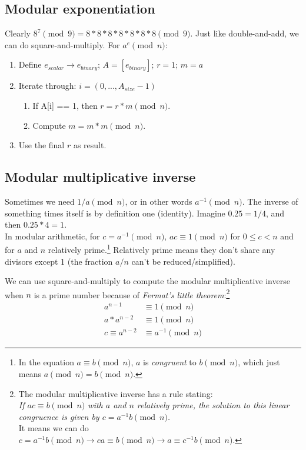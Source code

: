 \subsection{Modular exponentiation}

Clearly $8^7 \pmod 9 = 8*8*8*8*8*8*8 \pmod 9$. Just like double-and-add, we can do square-and-multiply. For $a^e \pmod{n}$:
\begin{enumerate}
	\item Define $e_{scalar} \rightarrow e_{binary}$; $A = [e_{binary}]$; $r = 1$; $m = a$
	\item Iterate through: $i = (0,...,A_{size} - 1)$
	\begin{enumerate}
		\item If A[i] == 1, then $r = r * m \pmod n$.
		\item Compute $m = m * m \pmod n$.
	\end{enumerate}
	\item Use the final $r$ as result.
\end{enumerate}


\subsection{Modular multiplicative inverse}

Sometimes we need $1/a \pmod n$, or in other words $a^{-1} \pmod n$. The inverse of something times itself is by definition one (identity). Imagine $0.25 = 1/4$, and then $0.25*4 = 1$.\\

In modular arithmetic, for $c = a^{-1} \pmod{n}$, $a c \equiv 1 \pmod{n}$ for $0 \leq c < n$ and for $a$ and $n$ relatively prime.\footnote{In the equation $a \equiv b \pmod{n}$, $a$ is {\em congruent} to $b \pmod{n}$, which just means \(a \pmod{n} = b \pmod{n}\).} Relatively prime means they don't share any divisors except 1 (the fraction $a/n$ can't be reduced/simplified).

We can use square-and-multiply to compute the modular multiplicative inverse when $n$ is a prime number because of {\em Fermat's little theorem}:\footnote{\label{inverse_rule_note}The modular multiplicative inverse has a rule stating:\\
{\em If $a c \equiv b \pmod{n}$ with $a$ and $n$ relatively prime, the solution to this linear congruence is given by \(c = a^{-1} b \pmod{n}\).}\cite{wiki-modular-arithmetic}\\
It means we can do $c = a^{-1} b \pmod n \rightarrow ca \equiv b \pmod n \rightarrow a \equiv c^{-1} b \pmod n$.}\vspace{.175cm}
\begin{align*} 
    a^{n-1} &\equiv 1 \pmod{n} \\
    a*a^{n-2} &\equiv 1 \pmod{n} \\
    c \equiv a^{n-2} &\equiv a^{-1} \pmod{n}
\end{align*}

